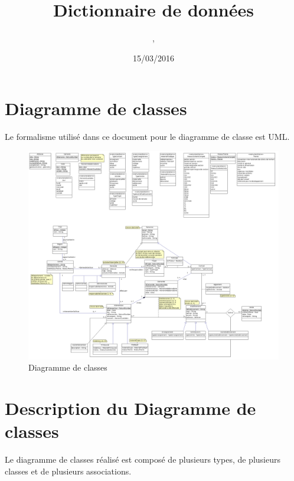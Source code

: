 \documentclass[asi, sansVersion]{picInsa}
\begin{document}
\title{Dictionnaire de données}
\author{\Mathieu, \Julie}
\date{15/03/2016} 

\maketitle

\tableofcontents

\chapter{Diagramme de classes}

Le formalisme utilisé dans ce document pour le diagramme de classe est UML.

\begin{landscape}
\begin{figure}
	\centering
	\includegraphics[scale=0.3]{images/diagrammeDeClasses}
	\caption{\label{modele}Diagramme de classes}
\end{figure}
\end{landscape}

\chapter{Description du Diagramme de classes}

Le diagramme de classes réalisé est composé de plusieurs types, de plusieurs classes et de plusieurs associations. \\ 
\end{document}
